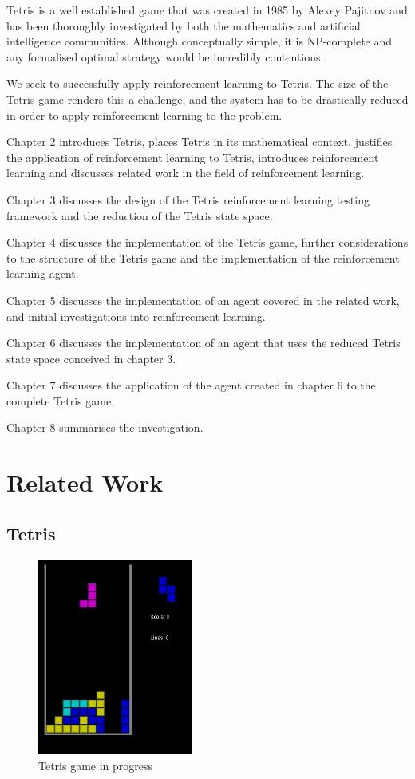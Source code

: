 \documentclass{rucsthesis}
\begin{document}
Tetris is a well established game that was created in 1985 by Alexey Pajitnov and has been thoroughly investigated by both the mathematics and artificial intelligence communities. Although conceptually simple, it is NP-complete \citep{hardtet} and any formalised optimal strategy would be incredibly contentious.

We seek to successfully apply reinforcement learning to Tetris. The size of the Tetris game renders this a challenge, and the system has to be drastically reduced in order to apply reinforcement learning to the problem.

 Chapter 2 introduces Tetris, places Tetris in its mathematical context, justifies the application of reinforcement learning to Tetris, introduces reinforcement learning and discusses related work in the field of reinforcement learning.

Chapter 3 discusses the design of the Tetris reinforcement learning testing framework and the reduction of the Tetris state space.

Chapter 4 discusses the implementation of the Tetris game, further considerations to the structure of the Tetris game and the implementation of the reinforcement learning agent.

Chapter 5 discusses the implementation of an agent covered in the related work, and initial investigations into reinforcement learning.

Chapter 6 discusses the implementation of an agent that uses the reduced Tetris state space conceived in chapter 3.

Chapter 7 discusses the application of the agent created in chapter 6 to the complete Tetris game.

Chapter 8 summarises the investigation.

\chapter{Related Work}

\section{Tetris}

\begin{figure}[h]
\centering%
\includegraphics[width=2in]{tetgame.jpg}
\caption{Tetris game in progress}
\label{fig:tetgame}
\end{figure}
\end{document}
